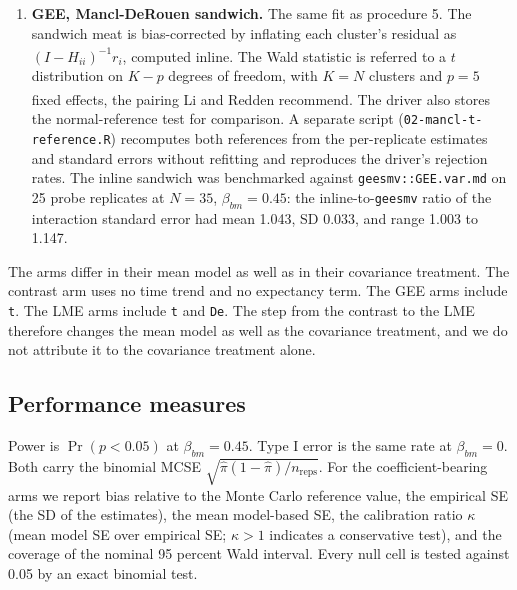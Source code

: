 \documentclass[
  11pt,
]{article}
\begin{document}
\begin{enumerate}
  \texttt{Sx\ \textasciitilde{}\ bm\ +\ t\ +\ Dbc\ +\ bm:Dbc} with a Gaussian family and
  \texttt{corstr\ =\ \textquotesingle{}ar1\textquotesingle{}}. The working correlation is a discrete-lag AR(1)
  on observation order within participant. The visits are at weeks
  0, 4, 8, 12, 16, 17, 18, 19, and 20, so the working correlation
  treats unequally spaced occasions as equally spaced. The LME arms
  use the continuous-time form instead. The test is the Wald \(z\)
  with the robust sandwich of Liang and Zeger\textsuperscript{}.
\item
  \textbf{GEE, Mancl-DeRouen sandwich.} The same fit as procedure 5.
  The sandwich meat is bias-corrected by inflating each cluster's
  residual as \((I - H_{ii})^{-1} r_i\)\textsuperscript{},
  computed inline. The Wald statistic is referred to a \(t\)
  distribution on \(K - p\) degrees of freedom, with \(K = N\) clusters
  and \(p = 5\) fixed effects, the pairing Li and Redden\textsuperscript{} recommend.
  The driver also stores the normal-reference test for comparison.
  A separate script (\texttt{02-mancl-t-reference.R}) recomputes both
  references from the per-replicate estimates and standard errors
  without refitting and reproduces the driver's rejection rates.
  The inline sandwich was benchmarked against \texttt{geesmv::GEE.var.md}
  on 25 probe replicates at \(N = 35\),
  \(\beta_{bm} = 0.45\): the inline-to-\texttt{geesmv} ratio of the
  interaction standard error had mean 1.043,
  SD 0.033, and range
  1.003 to 1.147.
\end{enumerate}

The arms differ in their mean model as well as in their covariance
treatment. The contrast arm uses no time trend and no expectancy
term. The GEE arms include \texttt{t}. The LME arms include \texttt{t} and \texttt{De}.
The step from the contrast to the LME therefore changes the mean
model as well as the covariance treatment, and we do not attribute
it to the covariance treatment alone.

\subsection{Performance measures}\label{performance-measures}

Power is \(\Pr(p < 0.05)\) at \(\beta_{bm} = 0.45\). Type I error is the
same rate at \(\beta_{bm} = 0\). Both carry the binomial MCSE
\(\sqrt{\hat\pi(1 - \hat\pi)/n_{\text{reps}}}\). For the
coefficient-bearing arms we report bias relative to the Monte Carlo
reference value, the empirical SE (the SD of the estimates), the
mean model-based SE, the calibration ratio \(\kappa\) (mean model SE
over empirical SE; \(\kappa > 1\) indicates a conservative test), and
the coverage of the nominal 95 percent Wald interval. Every null
cell is tested against 0.05 by an exact binomial test.
\end{document}
